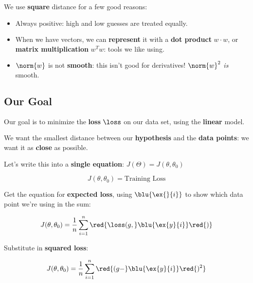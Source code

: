         We use \textbf{square} distance for a few good reasons:
        
        \begin{itemize}
            \item Always positive: high and low guesses are treated equally.
            \item When we have vectors, we can \textbf{represent} it with a \textbf{dot product} $w \cdot w$, or \textbf{matrix multiplication} $w^T w$: tools we like using.
            \item $\norm{w}$ is not \textbf{smooth}: this isn't good for derivatives! $\norm{w}^2$ \textit{is} smooth.
        \end{itemize}
        
    \subsection{Our Goal}
        
        Our goal is to minimize the \textbf{loss} $\loss$ on our data set, using the \textbf{linear} model.
        
        We want the smallest distance between our \textbf{hypothesis} and the \textbf{data points}: we want it as \textbf{close} as possible.
        
        Let's write this into a \textbf{single equation}: $J(\Theta)=J(\theta,\theta_0)$
        
        \begin{equation}
            J(\theta,\theta_0) = \text{Training Loss}
        \end{equation}
        
        Get the equation for \textbf{expected loss}, using $\blu{\ex{}{i}}$ to show which data point we're using in the sum:
        
        \begin{equation}
            J(\theta,\theta_0) = 
            \frac{1}{n}  \sum_{i=1}^n 
            \red{ \loss ( g, } \blu{\ex{y}{i}}  \red{)}
        \end{equation}
        
        Substitute in \textbf{squared loss}:
        
        \begin{equation}
            J(\theta,\theta_0) = 
            \frac{1}{n}  \sum_{i=1}^n 
            \red{ ( g -} \blu{ \ex{y}{i}} \red{)^2 }
        \end{equation}
        
